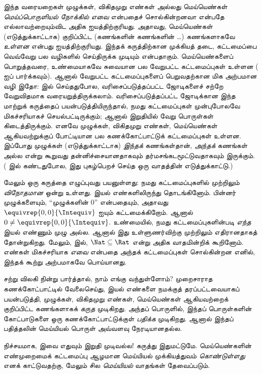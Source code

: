 \documentclass[../../../include/open-logic-section]{subfiles}
\begin{document}
இந்த வரையறைகள் முழுக்கள், விகிதமுறு எண்கள் அல்லது மெய்யெண்கள்
\emph{மெய்ப்பொருளியல் நோக்கில்} \emph{எவை} என்பதைச் சொல்கின்றனவா என்பதே
எல்லாவற்றையும்விட அதிக ஐயத்திற்குரியது.
அதாவது, மெய்யெண்கள் (எடுத்துக்காட்டாக) குறிப்பிட்ட
(கணங்களின் கணங்களின் \ldots) கணங்களாகவே \emph{உள்ளன} என்பது ஐயத்திற்குரியது.
இந்தக் கருத்திற்கான முக்கியத் தடை, கட்டமைப்பை வெவ்வேறு பல வழிகளில்
செய்திருக்க முடியும் என்பதாகும்.
மெய்யெண்களைப் பொறுத்தவரை, உண்மையாகவே சுவையான பல வேறுபட்ட
கட்டமைப்புகள் உள்ளன ( ஐப் பார்க்கவும்).
ஆனால் வேறுபட்ட கட்டமைப்புகளைப் பெறுவதற்கான மிக அற்பமான வழி இதோ:
 இல் செய்ததுபோல,
வரிசைப்படுத்தப்பட்ட ஜோடிகளைச் சற்றே வேறுவிதமாக வரையறுத்திருக்கலாம்.
வரிசைப்படுத்தப்பட்ட ஜோடிக்கான இந்த மாற்றுக் கருத்தைப் பயன்படுத்தியிருந்தால்,
நமது கட்டமைப்புகள் முன்புபோலவே மிகச்சரியாகச் செயல்பட்டிருக்கும்;
ஆனால் இறுதியில் வேறு பொருள்கள் கிடைத்திருக்கும்.
எனவே முழுக்கள், விகிதமுறு எண்கள், மெய்யெண்கள் ஆகியவற்றுக்குப்
போட்டியான பல கணக்கோட்பாட்டுக் கட்டமைப்புகள் உள்ளன.
இப்போது முழுக்கள் (எடுத்துக்காட்டாக) \emph{இந்தக்} கணங்கள்தான்,
\emph{அந்தக்} கணங்கள் அல்ல என்று கூறுவது தன்னிச்சையானதாகவும்
தர்மசங்கடமூட்டுவதாகவும் இருக்கும்.
( இல் கண்டதுபோல,
இது \citealt{Benacerraf1965} புகழ்பெறச் செய்த ஒரு வாதத்தின் எடுத்துக்காட்டு.)

மேலும் ஒரு கருத்தை எழுப்புவது பயனுள்ளது:
நமது கட்டமைப்புகளில் முற்றிலும் \emph{விநோதமான} ஒன்று உள்ளது.
இயல் எண்களிலிருந்து தொடங்கினோம்.
பின்னர் முழுக்களையும், ``முழுக்களின் $0$'' என்பதையும்,
அதாவது $ \equivrep{0,0}{\Intequiv}$ ஐயும் கட்டமைக்கிறோம்.
ஆனால் $0 \neq \equivrep{0,0}{\Intequiv}$.
உண்மையில், நமது கட்டமைப்புகளின்படி \emph{எந்த} இயல் எண்ணும் முழு அல்ல.
ஆனால் இது உள்ளுணர்விற்கு முற்றிலும் எதிரானதாகத் தோன்றுகிறது.
மேலும்,  இல்,
$\Nat \subseteq \Rat$ என்று அதிக வாதமின்றிக் கூறினோம்.
எண்கள் மிகச்சரியாக \emph{எவை} என்பதை அந்தக் கட்டமைப்புகள் சொல்கின்றன
எனில், இந்தக் கூற்று அற்பமாகவே பொய்யானது.

சற்று விலகி நின்று பார்த்தால், நாம் எங்கு வந்துள்ளோம்?
முறைசாராத கணக்கோட்பாட்டில் வேலைசெய்து,
இயல் எண்களை நமக்குத் தரப்பட்டவையாகப் பயன்படுத்தி,
முழுக்கள், விகிதமுறு எண்கள், மெய்யெண்கள் ஆகியவற்றைக் குறிப்பிட்ட
கணங்களாகக் \emph{கருத} முடிகிறது.
அந்தப் பொருளில், இந்தப் பொருள்களின் கோட்பாடுகளை ஒரு
கணக்கோட்பாட்டுக்குள் \emph{பதிக்க} முடிகிறது.
ஆனால் இந்தப் பதித்தலின் மெய்யியல் பொருள் அவ்வளவு நேரடியானதல்ல.

நிச்சயமாக, இவை எதுவும் இறுதி முடிவல்ல!{}
கருத்து இதுமட்டுமே.
மெய்யெண்களின் எண்முறைமைக் கட்டமைப்பு ஆழமான மெய்யியல் முக்கியத்துவம்
\emph{கொண்டுள்ளது} எனக் காட்டுவதற்கு,
மேலும் சில \emph{மெய்யியல்} வாதங்கள் தேவைப்படும்.

\end{document}
